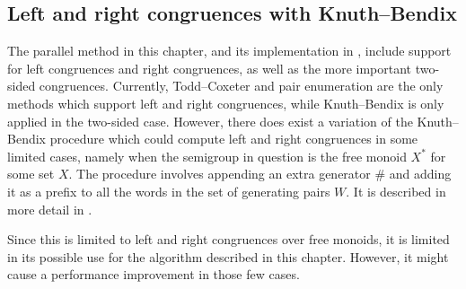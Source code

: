 \subsection{Left and right congruences with Knuth--Bendix}
\label{sec:kb-l-r}
The parallel method in this chapter, and its implementation in
\libsemigroups{}, include support for left congruences and right
congruences, as well as the more important two-sided congruences.  Currently,
Todd--Coxeter and pair enumeration are the only methods which support left and
right congruences, while Knuth--Bendix is only applied in the two-sided case.
However, there does exist a variation of the Knuth--Bendix procedure which could
compute left and right congruences in some limited cases, namely when the
semigroup in question is the free monoid $X^*$ for some set $X$.  The procedure
involves appending an extra generator $\#$ and adding it as a prefix to all the
words in the set of generating pairs $W$.  It is described in more detail in
\cite[\S 2.8]{sims}.

Since this is limited to left and right congruences over free monoids, it is
limited in its possible use for the algorithm described in this chapter.
However, it might cause a performance improvement in those few cases.

